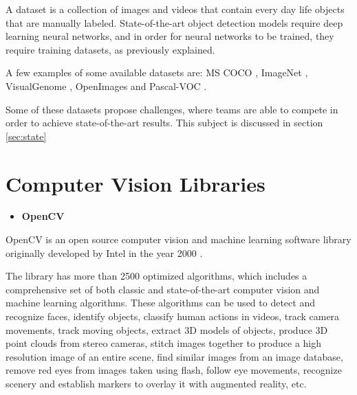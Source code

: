    \par A dataset is a collection of images and videos that contain every day life objects that are manually labeled. State-of-the-art object detection models require deep learning neural networks, and in order for neural networks to be trained, they  require training datasets, as previously explained.  

    \par A few examples of some available datasets are:  MS COCO \cite{Lin2014}, ImageNet \cite{Takamitsu1978} , VisualGenome \cite{Language2015}, OpenImages \cite{Kuznetsova2018} and Pascal-VOC \cite{Everingham2010}.

    \par Some of these datasets propose challenges, where teams are able to compete in order to achieve state-of-the-art results. This subject is discussed in section \ref{sec:state}



\section{Computer Vision Libraries}
\label{sec:libraries_cv}


    \begin{itemize}
        \item \textbf{OpenCV}
    \end{itemize}

    OpenCV is an open source computer vision and machine learning software library originally developed by Intel in the year 2000 \cite{Culjak2012}.\par

    The library has more than 2500 optimized algorithms, which includes a comprehensive set of both classic and state-of-the-art computer vision and machine learning algorithms. These algorithms can be used to detect and recognize faces, identify objects, classify human actions in videos, track camera movements, track moving objects, extract 3D models of objects, produce 3D point clouds from stereo cameras, stitch images together to produce a high resolution image of an entire scene, find similar images from an image database, remove red eyes from images taken using flash, follow eye movements, recognize scenery and establish markers to overlay it with augmented reality, etc. \cite{opencvweb} \par
    

